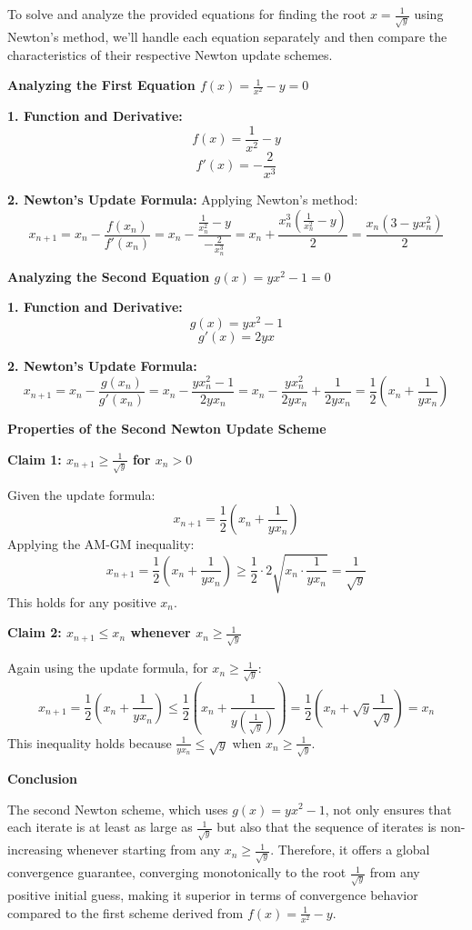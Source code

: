 \documentclass[8pt]{article}
\begin{document}
To solve and analyze the provided equations for finding the root \(x = \frac{1}{\sqrt{y}}\) using Newton's method, we'll handle each equation separately and then compare the characteristics of their respective Newton update schemes.

\textbf{
Analyzing the First Equation \(f(x) = \frac{1}{x^2} - y = 0\)}

\textbf{1. Function and Derivative:}
   \[
   f(x) = \frac{1}{x^2} - y
   \]
   \[
   f'(x) = -\frac{2}{x^3}
   \]

\textbf{2. Newton's Update Formula:}
   Applying Newton's method:
   \[
   x_{n+1} = x_n - \frac{f(x_n)}{f'(x_n)} = x_n - \frac{\frac{1}{x_n^2} - y}{-\frac{2}{x_n^3}} = x_n + \frac{x_n^3(\frac{1}{x_n^2} - y)}{2} = \frac{x_n(3 - yx_n^2)}{2}
   \]

\textbf{Analyzing the Second Equation \(g(x) = yx^2 - 1 = 0\)}

\textbf{1. Function and Derivative:}
   \[
   g(x) = yx^2 - 1
   \]
   \[
   g'(x) = 2yx
   \]

\textbf{2. Newton's Update Formula:}
   \[
   x_{n+1} = x_n - \frac{g(x_n)}{g'(x_n)} = x_n - \frac{yx_n^2 - 1}{2yx_n} = x_n - \frac{yx_n^2}{2yx_n} + \frac{1}{2yx_n} = \frac{1}{2} \left(x_n + \frac{1}{yx_n}\right)
   \]

\textbf{Properties of the Second Newton Update Scheme}

\textbf{Claim 1: \(x_{n+1} \geq \frac{1}{\sqrt{y}}\) for \(x_n > 0\)}

Given the update formula:
   \[
   x_{n+1} = \frac{1}{2} \left(x_n + \frac{1}{yx_n}\right)
   \]
Applying the AM-GM inequality:
   \[
   x_{n+1} = \frac{1}{2} \left(x_n + \frac{1}{yx_n}\right) \geq \frac{1}{2} \cdot 2\sqrt{x_n \cdot \frac{1}{yx_n}} = \frac{1}{\sqrt{y}}
   \]
This holds for any positive \(x_n\).

\textbf{Claim 2: \(x_{n+1} \leq x_n\) whenever \(x_n \geq \frac{1}{\sqrt{y}}\)}

Again using the update formula, for \(x_n \geq \frac{1}{\sqrt{y}}\):
\[
x_{n+1} = \frac{1}{2} \left(x_n + \frac{1}{yx_n}\right) \leq \frac{1}{2} \left(x_n + \frac{1}{y\left(\frac{1}{\sqrt{y}}\right)}\right) = \frac{1}{2} \left(x_n + \sqrt{y}\frac{1}{\sqrt{y}}\right) = x_n
\]
This inequality holds because \(\frac{1}{yx_n} \leq \sqrt{y}\) when \(x_n \geq \frac{1}{\sqrt{y}}\).

\textbf{Conclusion}

The second Newton scheme, which uses \(g(x) = yx^2 - 1\), not only ensures that each iterate is at least as large as \(\frac{1}{\sqrt{y}}\) but also that the sequence of iterates is non-increasing whenever starting from any \(x_n \geq \frac{1}{\sqrt{y}}\). Therefore, it offers a global convergence guarantee, converging monotonically to the root \(\frac{1}{\sqrt{y}}\) from any positive initial guess, making it superior in terms of convergence behavior compared to the first scheme derived from \(f(x) = \frac{1}{x^2} - y\).
\end{document}
